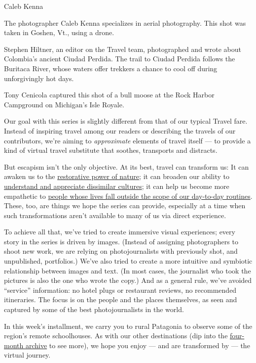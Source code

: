 Caleb Kenna

The photographer Caleb Kenna specializes in aerial photography. This
shot was taken in Goshen, Vt., using a drone.

Stephen Hiltner, an editor on the Travel team, photographed and wrote
about Colombia's ancient Ciudad Perdida. The trail to Ciudad Perdida
follows the Buritaca River, whose waters offer trekkers a chance to cool
off during unforgivingly hot days.

Tony Cenicola captured this shot of a bull moose at the Rock Harbor
Campground on Michigan's Isle Royale.

Our goal with this series is slightly different from that of our typical
Travel fare. Instead of inspiring travel among our readers or describing
the travels of our contributors, we're aiming to \emph{approximate}
elements of travel itself --- to provide a kind of virtual travel
substitute that soothes, transports and distracts.

But escapism isn't the only objective. At its best, travel can transform
us: It can awaken us to the
\href{https://www.nytimes3xbfgragh.onion/2020/06/24/travel/dolomites-italy-hut-hiking.html}{restorative
power of nature}; it can broaden our ability to
\href{https://www.nytimes3xbfgragh.onion/2020/06/08/travel/lens-sheep-island-maine.html}{understand
and appreciate dissimilar cultures}; it can help us become more
empathetic to
\href{https://www.nytimes3xbfgragh.onion/2020/06/15/travel/gujarat-india-portraits.html}{people
whose lives fall outside the scope of our day-to-day routines}. These,
too, are things we hope the series can provide, especially at a time
when such transformations aren't available to many of us via direct
experience.

To achieve all that, we've tried to create immersive visual experiences;
every story in the series is driven by images. (Instead of assigning
photographers to shoot new work, we are relying on photojournalists with
previously shot, and unpublished, portfolios.) We've also tried to
create a more intuitive and symbiotic relationship between images and
text. (In most cases, the journalist who took the pictures is also the
one who wrote the copy.) And as a general rule, we've avoided
``service'' information: no hotel plugs or restaurant reviews, no
recommended itineraries. The focus is on the people and the places
themselves, as seen and captured by some of the best photojournalists in
the world.

In this week's installment, we carry you to rural Patagonia to observe
some of the region's remote schoolhouses. As with our other destinations
(dip into the
\href{https://www.nytimes3xbfgragh.onion/column/the-world-through-a-lens}{four-month
archive} to see more), we hope you enjoy --- and are transformed by ---
the virtual journey.

